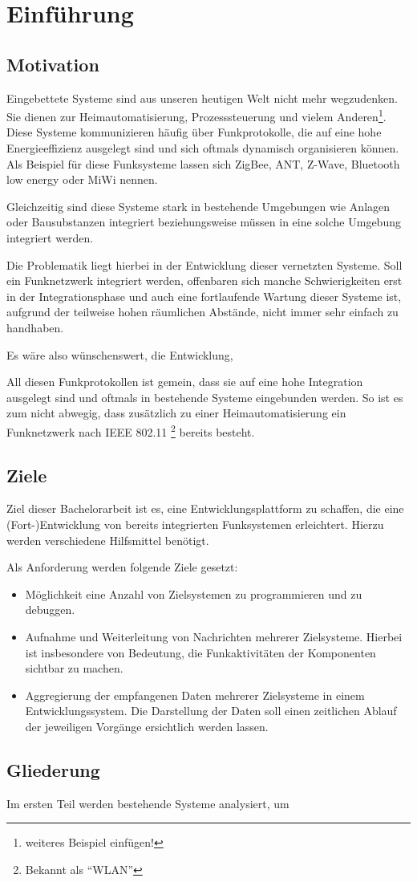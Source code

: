 \chapter{Einführung}
\adjustmtc
\minitoc
\section{Motivation}
Eingebettete Systeme sind aus unseren heutigen Welt nicht mehr wegzudenken. Sie
dienen zur Heimautomatisierung, Prozesssteuerung und vielem
Anderen\footnote{weiteres Beispiel einfügen!}. Diese Systeme kommunizieren
häufig über Funkprotokolle, die auf eine hohe Energieeffizienz ausgelegt sind
und sich oftmals dynamisch organisieren können. Als Beispiel für diese
Funksysteme lassen sich ZigBee, ANT, Z-Wave, Bluetooth low energy oder MiWi
nennen.

Gleichzeitig sind diese Systeme stark in bestehende Umgebungen wie Anlagen oder
Bausubstanzen integriert beziehungsweise müssen in eine solche Umgebung
integriert werden.

Die Problematik liegt hierbei in der Entwicklung dieser vernetzten Systeme. Soll
ein Funknetzwerk integriert werden, offenbaren sich manche Schwierigkeiten erst
in der Integrationsphase und auch eine fortlaufende Wartung dieser Systeme ist,
aufgrund der teilweise hohen räumlichen Abstände, nicht immer sehr einfach zu
handhaben.

Es wäre also wünschenswert, die Entwicklung, 

All diesen Funkprotokollen ist gemein, dass sie auf eine hohe Integration
ausgelegt sind und oftmals in bestehende Systeme eingebunden werden. So ist es
zum nicht abwegig, dass zusätzlich zu einer Heimautomatisierung ein
Funknetzwerk nach IEEE 802.11 \footnote{Bekannt als "`WLAN"'} bereits
besteht.

\cite*{sample_bib}
\section{Ziele}
Ziel dieser Bachelorarbeit ist es, eine Entwicklungsplattform zu schaffen, die
eine (Fort-)Entwicklung von bereits integrierten Funksystemen erleichtert.
Hierzu werden verschiedene Hilfsmittel benötigt.

Als Anforderung werden folgende Ziele gesetzt:
\begin{itemize}
  \item Möglichkeit eine Anzahl von Zielsystemen zu programmieren und zu
  debuggen.
  \item Aufnahme und Weiterleitung von Nachrichten mehrerer Zielsysteme. Hierbei
  ist insbesondere von Bedeutung, die Funkaktivitäten der Komponenten sichtbar
  zu machen.
  \item Aggregierung der empfangenen Daten mehrerer Zielsysteme in einem
  Entwicklungssystem. Die Darstellung der Daten soll einen zeitlichen Ablauf
  der jeweiligen Vorgänge ersichtlich werden lassen.
\end{itemize}
\section{Gliederung}
Im ersten Teil werden bestehende Systeme analysiert, um 
